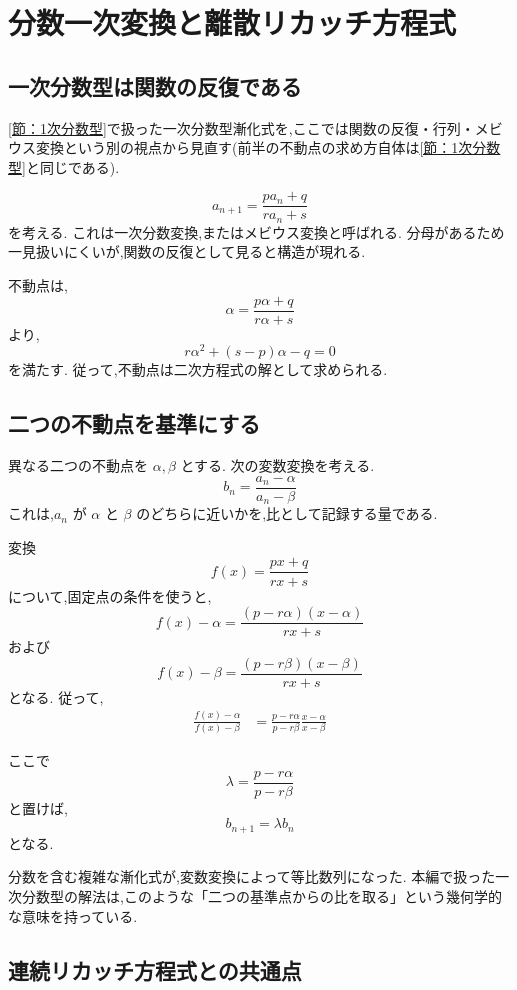 
\section{分数一次変換と離散リカッチ方程式}

\subsection{一次分数型は関数の反復である}

\ref{節：1次分数型}で扱った一次分数型漸化式を,ここでは関数の反復・行列・メビウス変換という別の視点から見直す(前半の不動点の求め方自体は\ref{節：1次分数型}と同じである).

\[
  a_{n+1}=\frac{pa_n+q}{ra_n+s}
\]
を考える.
これは一次分数変換,またはメビウス変換と呼ばれる.
分母があるため一見扱いにくいが,関数の反復として見ると構造が現れる.

不動点は,
\[
  \alpha=\frac{p\alpha+q}{r\alpha+s}
\]
より,
\[
  r\alpha^2+(s-p)\alpha-q=0
\]
を満たす.
従って,不動点は二次方程式の解として求められる.

\subsection{二つの不動点を基準にする}

異なる二つの不動点を $\alpha,\beta$ とする.
次の変数変換を考える.
\[
  b_n=\frac{a_n-\alpha}{a_n-\beta}
\]
これは,$a_n$ が $\alpha$ と $\beta$ のどちらに近いかを,比として記録する量である.

変換
\[
  f(x)=\frac{px+q}{rx+s}
\]
について,固定点の条件を使うと,
\[
  f(x)-\alpha
  =
  \frac{(p-r\alpha)(x-\alpha)}{rx+s}
\]
および
\[
  f(x)-\beta
  =
  \frac{(p-r\beta)(x-\beta)}{rx+s}
\]
となる.
従って,
\[
  \begin{aligned}
    \frac{f(x)-\alpha}{f(x)-\beta}
     & =
    \frac{p-r\alpha}{p-r\beta}
    \frac{x-\alpha}{x-\beta}
  \end{aligned}
\]

ここで
\[
  \lambda=\frac{p-r\alpha}{p-r\beta}
\]
と置けば,
\[
  b_{n+1}=\lambda b_n
\]
となる.

分数を含む複雑な漸化式が,変数変換によって等比数列になった.
本編で扱った一次分数型の解法は,このような「二つの基準点からの比を取る」という幾何学的な意味を持っている.

\subsection{連続リカッチ方程式との共通点}

